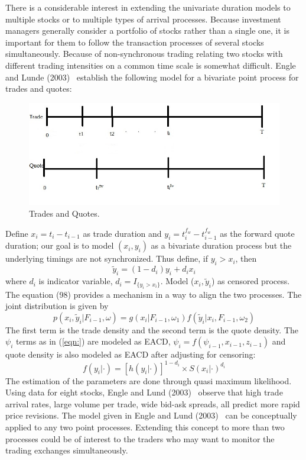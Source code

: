There is a considerable interest in extending the univariate duration models to multiple stocks or to multiple types of arrival processes. Because investment managers generally consider a portfolio of stocks rather than a single one, it is important for them to follow the transaction processes of several stocks simultaneously. Because of non-synchronous trading relating two stocks with different trading intensities on a common time scale is somewhat difficult. Engle and Lunde (2003)~\cite{englelunde} establish the following model for a bivariate point process for trades and quotes:
	\begin{figure}[!ht]
	\centering
	\includegraphics[width=\textwidth]{chapters/chapter_uvts/figures/33d3.jpg}
	\caption{Trades and Quotes. \label{fig:tradeactdoubline}}
	\end{figure}
Define $x_i = t_i - t_{i-1}$ as trade duration and $y_i = t_i^{f_w} - t_{i-1}^{f_w}$ as the forward quote duration; our goal is to model $(x_i,y_i)$ as a bivariate duration process but the underlying timings are not synchronized. Thus define, if $y_i > x_i$, then
	\begin{equation}\label{eqn:anothertildey}
	\widetilde{y}_i = (1 - d_i)y_i + d_ix_i
	\end{equation}
where $d_i$ is indicator variable, $d_i = I_{\{y_i>x_i\}}$. Model ($x_i,\widetilde{y}_i$) as censored process. The equation (98) provides a mechanism in a way to align the two processes. The joint distribution is given by
	\begin{equation}\label{eqn:2pxiyi}
	p(x_i,\widetilde{y}_i | F_{i-1},\omega) = g(x_i|F_{i-1},\omega_1) f(\widetilde{y}_i | x_i,F_{i-1},\omega_2)
	\end{equation}
The first term is the trade density and the second term is the quote density. The $\psi_i$ terms as in (\ref{eqn:}) are modeled as EACD, $\psi_i= f(\psi_{i-1},x_{i-1},z_{i-1})$ and quote density is also modeled as EACD after adjusting for censoring:
	\begin{equation}\label{eqn:2fdot}
	f(y_i|\cdot) = [h(y_i|\cdot)]^{1-d_i} \times S(x_i|\cdot)^{d_i}
	\end{equation}
The estimation of the parameters are done through quasi maximum likelihood. Using data for eight stocks, Engle and Lund (2003)~\cite{englelunde} observe that high trade arrival rates, large volume per trade, wide bid-ask spreads, all predict more rapid price revisions. The model given in Engle and Lund (2003)~\cite{englelunde} can be conceptually applied to any two point processes. Extending this concept to more than two processes could be of interest to the traders who may want to monitor the trading exchanges simultaneously. 



